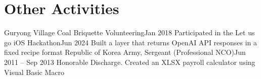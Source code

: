 \section{Other Activities}
    \begin{itemize}[leftmargin=0.15in, label={}]
     \resumeSubheading
        {Guryong Village Coal Briquette Volunteering}{Jan 2018}
        {}{}
     \resumeSubheading
        {Participated in the Let us go iOS Hackathon}{Jun 2024}
        {Built a layer that returns OpenAI API responses in a fixed recipe format}{}
     \resumeSubheading
        {Republic of Korea Army, Sergeant (Professional NCO)}{Jun 2011 -- Sep 2013}
        {Honorable Discharge. Created an XLSX payroll calculator using Visual Basic Macro}{}
    \end{itemize}